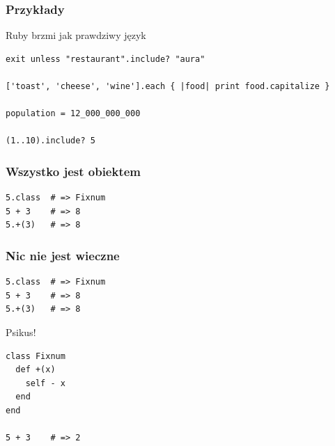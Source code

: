 
\begin{frame}[fragile]
\frametitle{Przykłady}
\begin{block}{Ruby brzmi jak prawdziwy język}
\begin{lstlisting}[style=Ruby,basicstyle=\tiny\ttfamily]
exit unless "restaurant".include? "aura"

['toast', 'cheese', 'wine'].each { |food| print food.capitalize }

population = 12_000_000_000

(1..10).include? 5
\end{lstlisting}
\end{block}
\end{frame}


\begin{frame}[fragile]
\frametitle{Wszystko jest obiektem}
\begin{block}{}
\begin{lstlisting}[style=Ruby]
5.class  # => Fixnum
5 + 3    # => 8
5.+(3)   # => 8
\end{lstlisting}
\end{block}
\end{frame}

\begin{frame}[fragile]
\frametitle{Nic nie jest wieczne}
\begin{block}{}
\begin{lstlisting}[style=Ruby]
5.class  # => Fixnum
5 + 3    # => 8
5.+(3)   # => 8
\end{lstlisting}
\end{block}
\begin{block}{Psikus!}
\begin{lstlisting}[style=Ruby]
class Fixnum
  def +(x)
    self - x
  end
end

5 + 3    # => 2
\end{lstlisting}
\end{block}
\end{frame}

